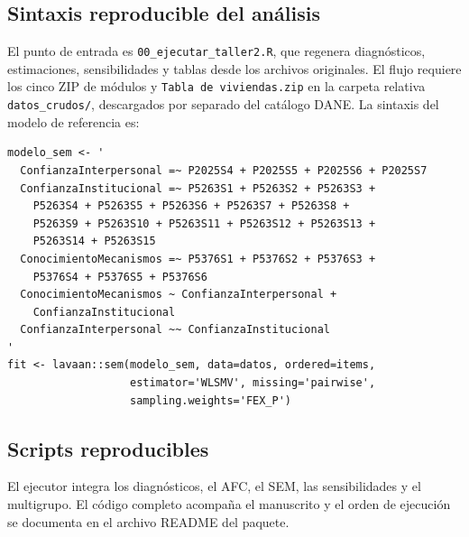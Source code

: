 \documentclass[11pt,letterpaper]{article}
\begin{document}
\subsection{Sintaxis reproducible del análisis}
\label{ap:codigo}
El punto de entrada es \texttt{00\_ejecutar\_taller2.R}, que regenera diagnósticos, estimaciones, sensibilidades y tablas desde los archivos originales. El flujo requiere los cinco ZIP de módulos y \texttt{Tabla de viviendas.zip} en la carpeta relativa \texttt{datos\_crudos/}, descargados por separado del catálogo DANE. La sintaxis del modelo de referencia es:
\begin{verbatim}
modelo_sem <- '
  ConfianzaInterpersonal =~ P2025S4 + P2025S5 + P2025S6 + P2025S7
  ConfianzaInstitucional =~ P5263S1 + P5263S2 + P5263S3 +
    P5263S4 + P5263S5 + P5263S6 + P5263S7 + P5263S8 +
    P5263S9 + P5263S10 + P5263S11 + P5263S12 + P5263S13 +
    P5263S14 + P5263S15
  ConocimientoMecanismos =~ P5376S1 + P5376S2 + P5376S3 +
    P5376S4 + P5376S5 + P5376S6
  ConocimientoMecanismos ~ ConfianzaInterpersonal +
    ConfianzaInstitucional
  ConfianzaInterpersonal ~~ ConfianzaInstitucional
'
fit <- lavaan::sem(modelo_sem, data=datos, ordered=items,
                   estimator='WLSMV', missing='pairwise',
                   sampling.weights='FEX_P')
\end{verbatim}

\subsection*{Scripts reproducibles}
El ejecutor integra los diagnósticos, el AFC, el SEM, las sensibilidades y el multigrupo. El código completo acompaña el manuscrito y el orden de ejecución se documenta en el archivo README del paquete.
\end{document}
